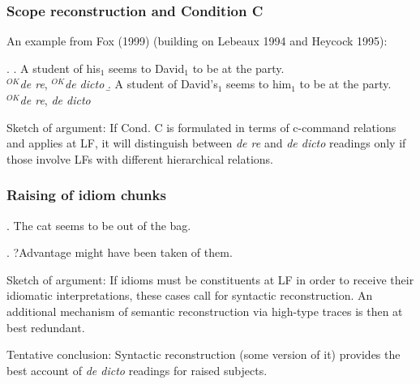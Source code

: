 \subsubsection{Scope reconstruction and Condition C}

An  %
example from Fox (1999) (building on Lebeaux 1994 and Heycock 1995):

\ex. \a. A student of his$_{1}$ seems to David$_1$ to be at the party.\\
\null\hfill $^{OK}$\emph{de re}, $^{OK}$\emph{de dicto} 
\b. A student of David's$_{1}$ seems to him$_{1}$ to be at the party.\\
\null\hfill $^{OK}$\emph{de re}, {\small *}\emph{de dicto}

Sketch of argument: If Cond. C is formulated in terms of c-command relations and applies at LF, it will distinguish between \emph{de re} and \emph{de dicto} readings only if those involve LFs with different hierarchical relations.

\enlargethispage{36pt}

\subsubsection{Raising of idiom chunks}

\ex. The cat seems to be out of the bag.

\ex. ?Advantage might have been taken of them.

Sketch of argument: If idioms must be constituents at LF in order to receive their idiomatic interpretations, these cases call for syntactic reconstruction. An additional mechanism of semantic reconstruction via high-type traces is then at best redundant.

\medskip\noindent Tentative conclusion: Syntactic reconstruction (some version of it) provides the best account of \emph{de dicto} readings for raised subjects.
